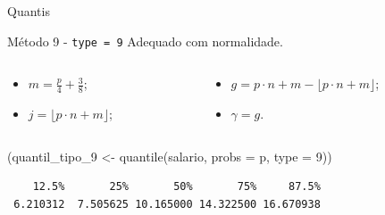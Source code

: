 \documentclass[
  10pt,
  ignorenonframetext,
]{beamer}
\newenvironment{Shaded}{\begin{snugshade}}{\end{snugshade}}
\newcommand{\AttributeTok}[1]{\textcolor[rgb]{0.40,0.45,0.13}{#1}}
\newcommand{\DecValTok}[1]{\textcolor[rgb]{0.68,0.00,0.00}{#1}}
\newcommand{\FunctionTok}[1]{\textcolor[rgb]{0.28,0.35,0.67}{#1}}
\newcommand{\NormalTok}[1]{\textcolor[rgb]{0.00,0.23,0.31}{#1}}
\newcommand{\OtherTok}[1]{\textcolor[rgb]{0.00,0.23,0.31}{#1}}
\providecommand{\tightlist}{%
  \setlength{\itemsep}{0pt}\setlength{\parskip}{0pt}}\usepackage{longtable,booktabs,array}
\begin{document}
\begin{frame}[fragile]{Quantis}
\protect\hypertarget{quantis-6}{}
\begin{block}{Método 9 - \texttt{type\ =\ 9}}
\protect\hypertarget{muxe9todo-9---type-9}{}
Adequado com normalidade.

\begin{columns}[T]
\begin{column}{0.3\textwidth}
\begin{itemize}
\tightlist
\item
  \(m=\frac{p}{4}+\frac{3}{8}\);
\item
  \(j=\lfloor p\cdot n + m \rfloor\);
\end{itemize}
\end{column}

\begin{column}{0.7\textwidth}
\begin{itemize}
\tightlist
\item
  \(g = p\cdot n + m- \lfloor p\cdot n+m \rfloor\);
\item
  \(\gamma = g\).
\end{itemize}
\end{column}
\end{columns}

\begin{Shaded}
\begin{Highlighting}[]
\NormalTok{(quantil\_tipo\_9 }\OtherTok{\textless{}{-}} \FunctionTok{quantile}\NormalTok{(salario, }\AttributeTok{probs =}\NormalTok{ p, }\AttributeTok{type =} \DecValTok{9}\NormalTok{))}
\end{Highlighting}
\end{Shaded}

\begin{verbatim}
    12.5%       25%       50%       75%     87.5% 
 6.210312  7.505625 10.165000 14.322500 16.670938 
\end{verbatim}
\end{block}
\end{frame}
\end{document}
